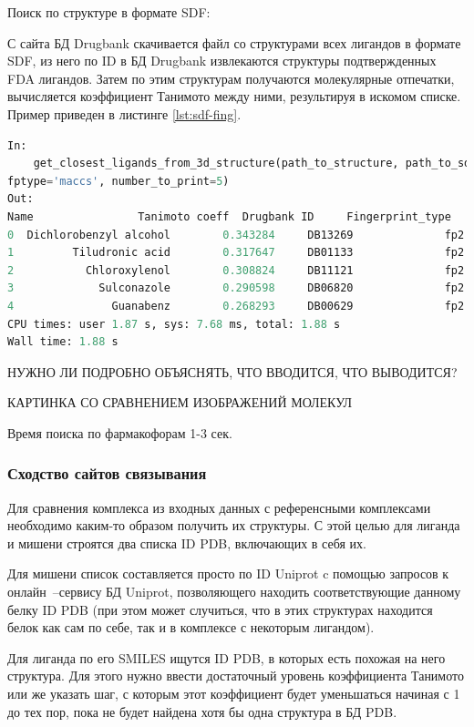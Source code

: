\documentclass[a4paper,14pt]{article}         %
\begin{document}
Поиск по структуре в формате SDF:

С сайта БД Drugbank скачивается файл со структурами всех лигандов в формате SDF, из него по ID в БД Drugbank извлекаются структуры подтвержденных FDA лигандов. Затем по этим структурам получаются молекулярные отпечатки, вычисляется коэффициент Танимото между ними, результируя в искомом списке. Пример приведен в листинге \ref{lst:sdf-fing}.

\begin{lstlisting}[language=Python, label={lst:sdf-fing}, caption={Сходство лигандов по топологическим молекулярным отпечаткам с помощью ПМ Open Babel для входных данных~--- SDF структуры молекулы.}]
In: 
	get_closest_ligands_from_3d_structure(path_to_structure, path_to_sdf_approved, root,
fptype='maccs', number_to_print=5)
Out:
Name  				Tanimoto coeff 	Drugbank ID 	Fingerprint_type
0  Dichlorobenzyl alcohol        0.343284     DB13269              fp2
1         Tiludronic acid        0.317647     DB01133              fp2
2           Chloroxylenol        0.308824     DB11121              fp2
3             Sulconazole        0.290598     DB06820              fp2
4               Guanabenz        0.268293     DB00629              fp2
CPU times: user 1.87 s, sys: 7.68 ms, total: 1.88 s
Wall time: 1.88 s
\end{lstlisting}
\color{orange} НУЖНО ЛИ ПОДРОБНО ОБЪЯСНЯТЬ, ЧТО ВВОДИТСЯ, ЧТО ВЫВОДИТСЯ?
\color{black}

\color{orange} КАРТИНКА СО СРАВНЕНИЕМ ИЗОБРАЖЕНИЙ МОЛЕКУЛ
\color{black}

Время поиска по фармакофорам 1-3 сек.
\subsubsection{Сходство сайтов связывания}
Для сравнения комплекса из входных данных с референсными комплексами необходимо каким-то образом получить их структуры. С этой целью для лиганда и мишени строятся два списка ID PDB, включающих в себя их. 

Для мишени список составляется просто по ID Uniprot c помощью запросов к онлайн~--сервису БД Uniprot, позволяющего находить соответствующие данному белку ID PDB (при этом может случиться, что в этих структурах находится белок как сам по себе, так и в комплексе с некоторым лигандом). 

Для лиганда по его SMILES ищутся ID PDB, в которых есть похожая на него структура. Для этого нужно ввести достаточный уровень коэффициента Танимото или же указать шаг, с которым этот коэффициент будет уменьшаться начиная с 1 до тех пор, пока не будет найдена хотя бы одна структура в БД PDB.
\end{document}
